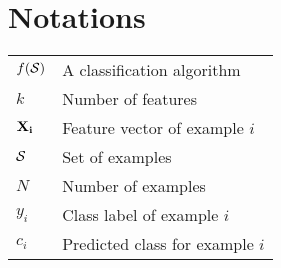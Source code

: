 
\chapter{Notations}
	
\begin{tabularx}{\textwidth}{ l X }
$f(\cal S)$ & A classification algorithm \dotfill \pageref{ntn:ch2:1} \\
$k$ & Number of features \dotfill \pageref{ntn:ch2:1} \\
$\bf{X}_i$ & Feature vector of example $i$ \dotfill \pageref{ntn:ch2:1} \\
$\cal S$ & Set of examples \dotfill \pageref{ntn:ch2:1} \\
$N $ & Number of examples \dotfill \pageref{ntn:ch2:1} \\
$y_i$ & Class label of example $i$ \dotfill \pageref{ntn:ch2:1} \\
$c_i$ & Predicted class for example $i$  \dotfill \pageref{ntn:ch2:1} \\
\end{tabularx}
